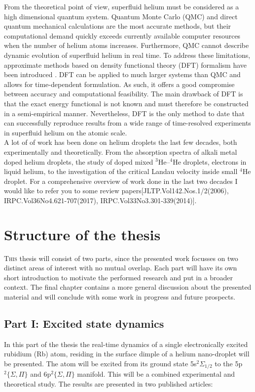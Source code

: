 \documentclass[12pt,a4paper]{book}
\begin{document}
		From the theoretical point of view, superfluid helium must be considered as a high dimensional quantum system. Quantum Monte Carlo (QMC) \cite{Kro02} and direct quantum mechanical \cite{deL06,deL10,Agu13} calculations are the most accurate methods, but their computational demand quickly exceeds currently available computer resources when the number of helium atoms increases. Furthermore, QMC cannot describe dynamic evolution of superfluid helium in real time. To address these limitations, approximate methods based on  density functional theory (DFT) formalism have been introduced \cite{Str87a,Str87b,Dal95}. DFT can be applied to much larger systems than QMC and allows for time-dependent formulation. As such, it offers a good compromise between accuracy and computational feasibility. The main drawback of DFT is that the exact energy functional is not known and must therefore be constructed in a semi-empirical manner. Nevertheless, DFT is the only method to date that can successfully reproduce results from a wide range of time-resolved experiments in superfluid helium on the atomic scale.\\
		
	A lot of of work has been done on helium droplets the last few decades, both experimentally and theoretically. From the absorption spectra of alkali metal doped helium droplets, the study of doped mixed $^3$He--$^4$He droplets, electrons in liquid helium, to the investigation of the critical Landau velocity inside small $^4$He droplet. For a comprehensive overview of work done in the last two decades I would like to refer you to some review papers[JLTP.Vol142.Nos.1/2(2006), IRPC.Vol36No4.621-707(2017), IRPC.Vol33No3.301-339(2014)].

	\section{Structure of the thesis}
		\lettrine[lines=3,findent=3pt,nindent=0pt]{T}{his} thesis will consist of two parts, since the presented work focusses on two distinct areas of interest with no mutual overlap. Each part will have its own short introduction to motivate the performed research and put in a broader context. The final chapter contains a more general discussion about the presented material and will conclude with some work in progress and future prospects.

		\subsection{Part I: Excited state dynamics}
			In this part of the thesis the real-time dynamics of a single electronically excited rubidium (Rb) atom, residing in the surface dimple of a helium nano-droplet will be presented. The atom will be excited from its ground state 5s$^2\Sigma_{1/2}$ to the 5p$^2\{\Sigma,\Pi\}$ and 6p$^2\{\Sigma,\Pi\}$ manifold. This will be a combined experimental and theoretical study. The results are presented in two published articles:\\
		
\end{document}
